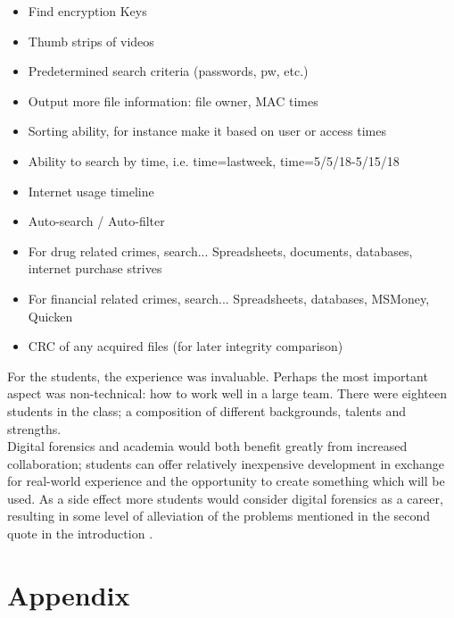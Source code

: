 \documentclass[12pt]{article}
\begin{document}
{\begin{itemize}
\begin{itemize}
    \item images of item
    \item unique item ID
    \item file contents
    \item ranking within set of evidence
    \item image thumbnails
    \item collection statistics
  \end{itemize}
  \item Find encryption Keys 
  \item Thumb strips of videos
  \item Predetermined search criteria (passwords, pw, etc.)
  \item Output more file information: file owner, MAC times
  \item Sorting ability, for instance make it based on user or access times
  \item Ability to search by time, i.e. time=lastweek, time=5/5/18-5/15/18
  \item Internet usage timeline
  \item Auto-search / Auto-filter
  \item For drug related crimes, search... Spreadsheets, documents, databases, internet purchase strives
  \item For financial related crimes, search... Spreadsheets, databases, MSMoney, Quicken
  \item CRC of any acquired files (for later integrity comparison)
\end{itemize}
\vspace{0.5 cm}
}

For the students, the experience was invaluable. Perhaps the most important aspect was non-technical:
how to work well in a large team. There were eighteen students in the class; a composition of different
backgrounds, talents and strengths.\\

Digital forensics and academia would both benefit greatly from increased collaboration; students can
offer relatively inexpensive development in exchange for real-world experience and the opportunity to
create something which will be used. As a side effect more students would consider digital forensics
as a career, resulting in some level of alleviation of the problems mentioned in the second quote in the
introduction \cite{hitchcock2016tiered}.


\section{Appendix}
\label{sect-Appendix}
\end{document}
